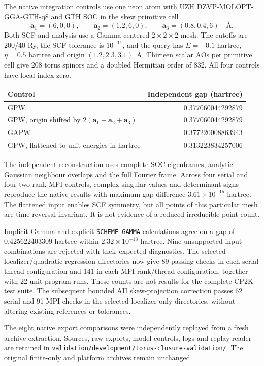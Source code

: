 \documentclass[11pt]{article}
\begin{document}
The native integration controls use one neon atom with UZH
DZVP-MOLOPT-GGA-GTH-q8 and GTH SOC in the skew primitive cell
\begin{equation}
 \bm a_1=(6,0,0),\qquad \bm a_2=(1.2,6,0),\qquad
 \bm a_3=(0.8,0.4,6)\quad\text{\AA}.
\end{equation}
Both SCF and analysis use a Gamma-centered $2\times2\times2$
mesh. The cutoffs are 200/40 Ry, the SCF tolerance is $10^{-11}$,
and the query has $E=-0.1$ hartree, $\eta=0.5$ hartree and
origin $(1.2,2.3,3.1)$~\AA. Thirteen scalar AOs per primitive
cell give 208 torus spinors and a doubled Hermitian order of 832.
All four controls have local index zero.
\begin{center}
\begin{tabular}{lr}
\hline
Control & Independent gap (hartree)\\
\hline
GPW & 0.377060044292879\\
GPW, origin shifted by $2(\bm a_1+\bm a_2+\bm a_3)$ & 0.377060044292879\\
GAPW & 0.377220008863943\\
GPW, flattened to unit energies in hartree & 0.313223834257006\\
\hline
\end{tabular}
\end{center}
The independent reconstruction uses complete SOC eigenframes,
analytic Gaussian neighbour overlaps and the full Fourier frame.
Across four serial and four two-rank MPI controls, complex
singular values and determinant signs reproduce the native
results with maximum gap difference $3.61\times10^{-15}$ hartree.
The flattened input enables SCF symmetry, but all points of this
particular mesh are time-reversal invariant. It is not evidence
of a reduced irreducible-point count.

Implicit Gamma and explicit \texttt{SCHEME GAMMA} calculations
agree on a gap of 0.425622403309 hartree within
$2.32\times10^{-13}$ hartree. Nine unsupported input combinations
are rejected with their expected diagnostics. The selected
localizer/quadratic regression directories now give 89 passing
checks in each serial thread configuration and 141 in each MPI
rank/thread configuration, together with 22 unit-program runs.
These counts are not results for the complete CP2K test suite.
The subsequent bounded AII skew-projection correction passes
62 serial and 91 MPI checks in the selected localizer-only
directories, without altering existing references or tolerances.

The eight native export comparisons were independently replayed
from a fresh archive extraction. Sources, raw exports, model
controls, logs and replay reader are retained in
\nolinkurl{validation/development/torus-closure-validation/}.
The original finite-only and platform archives remain unchanged.
\end{document}
